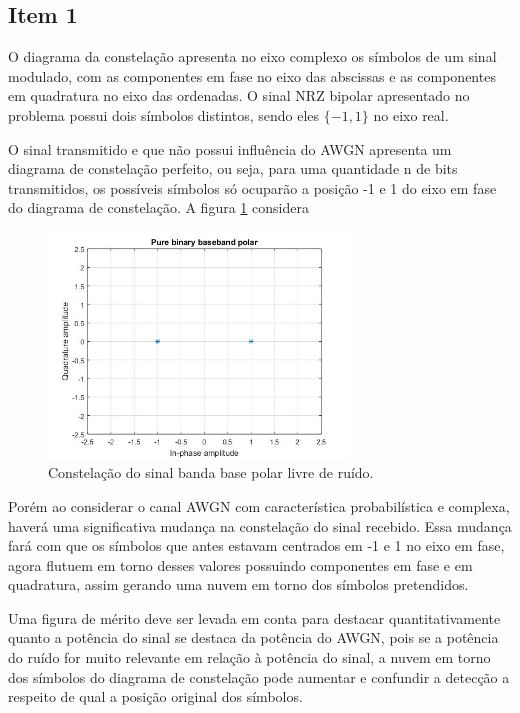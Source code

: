 \subsection*{Item 1}

O diagrama da constelação apresenta no eixo complexo os símbolos de um sinal modulado, com as componentes em fase no eixo das abscissas e as componentes em quadratura no eixo das ordenadas. O sinal NRZ bipolar apresentado no problema possui dois símbolos distintos, sendo eles $\{-1, 1\}$ no eixo real.

O sinal transmitido e que não possui influência do AWGN apresenta um diagrama de constelação perfeito, ou seja, para uma quantidade n de bits transmitidos, os possíveis símbolos só ocuparão a posição -1 e 1 do eixo em fase do diagrama de constelação. A figura \ref{fig:clean} considera

\begin{figure}[H] 
\centering
\includegraphics[width=8cm]{images/item1_clean.jpg}
\caption{Constelação do sinal banda base polar livre de ruído.}
\label{fig:clean} 
\end{figure}

Porém ao considerar o canal AWGN com característica probabilística e complexa, haverá uma significativa mudança na constelação do sinal recebido. Essa mudança fará com que os símbolos que antes estavam centrados em -1 e 1 no eixo em fase, agora flutuem em torno desses valores possuindo componentes em fase e em quadratura, assim gerando uma nuvem em torno dos símbolos pretendidos.

Uma figura de mérito deve ser levada em conta para destacar quantitativamente quanto a potência do sinal se destaca da potência do AWGN, pois se a potência do ruído for muito relevante em relação à potência do sinal, a nuvem em torno dos símbolos do diagrama de constelação pode aumentar e confundir a detecção a respeito de qual a posição original dos símbolos.

